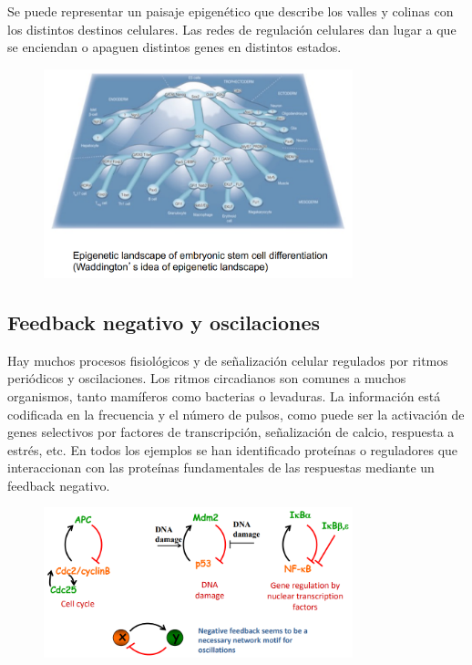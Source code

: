 Se puede representar un paisaje epigenético que describe los valles y colinas con los distintos destinos celulares. Las redes de regulación celulares dan lugar a que se enciendan o apaguen distintos genes en distintos estados. 

\begin{figure}[h]
\centering
\includegraphics[width = 0.8\textwidth]{figs/waddington.png}
\end{figure}

\subsection{Feedback negativo y oscilaciones}
Hay muchos procesos fisiológicos y de señalización celular regulados por ritmos periódicos y oscilaciones. Los ritmos circadianos son comunes a muchos organismos, tanto mamíferos como bacterias o levaduras. La información está codificada en la frecuencia y el número de pulsos, como puede ser la activación de genes selectivos por factores de transcripción, señalización de calcio, respuesta a estrés, etc. En todos los ejemplos se han identificado proteínas o reguladores que interaccionan con las proteínas fundamentales de las respuestas mediante un feedback negativo. 

\begin{figure}[h]
\centering
\includegraphics[width = 0.8\textwidth]{figs/feedback-negativo.png}
\end{figure}


